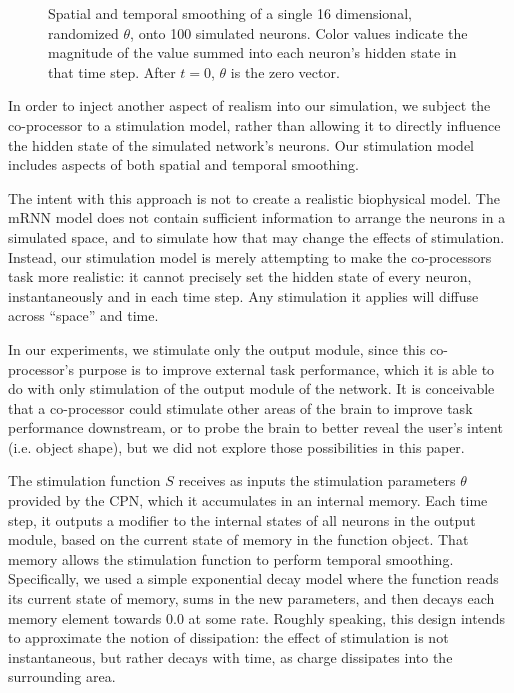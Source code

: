 \documentclass[12pt]{iopart}
\begin{document}
\begin{figure}[h]
	\caption{Spatial and temporal smoothing of a single 16 dimensional,
	         randomized $\theta$, onto 100 simulated neurons.
		 Color values indicate the magnitude of the value summed into
		 each neuron's hidden state in that time step. After $t=0$,
		 $\theta$ is the zero vector.}
	\label{fig:stim_single}
\end{figure}

In order to inject another aspect of realism into our simulation, we subject
the co-processor to a stimulation model, rather than allowing it to directly
influence the hidden state of the simulated network's neurons. Our stimulation
model includes aspects of both spatial and temporal smoothing.

The intent with this approach is not to create a realistic biophysical model. The
mRNN model does not contain sufficient information to arrange the neurons in a
simulated space, and to simulate how that may change the effects of stimulation.
Instead, our stimulation model is merely attempting to make the co-processors task
more realistic: it cannot precisely set the hidden state of every neuron,
instantaneously and in each time step. Any stimulation it applies will diffuse
across ``space'' and time.

In our experiments, we stimulate only the output module, since this co-processor's
purpose is to improve external task performance, which it is able to do with
only stimulation of the output module of the network. It is conceivable that
a co-processor could stimulate other areas of the brain to improve task performance
downstream, or to probe the brain to better reveal the user's intent (i.e. object
shape), but we did not explore those possibilities in this paper.

The stimulation function $S$ receives as inputs the stimulation parameters $\theta$
provided by the CPN, which it accumulates in an internal memory. Each time step,
it outputs a modifier to the internal states of all neurons in the output module,
based on the current state of memory in the function object. That memory allows
the stimulation function to perform temporal smoothing. Specifically, we used a
simple exponential decay model where the function reads its current state of memory,
sums in the new parameters, and then decays each memory element towards $0.0$ at some
rate. Roughly speaking, this design intends to approximate the notion of dissipation: the
effect of stimulation is not instantaneous, but rather decays with time, as charge
dissipates into the surrounding area.
\end{document}
